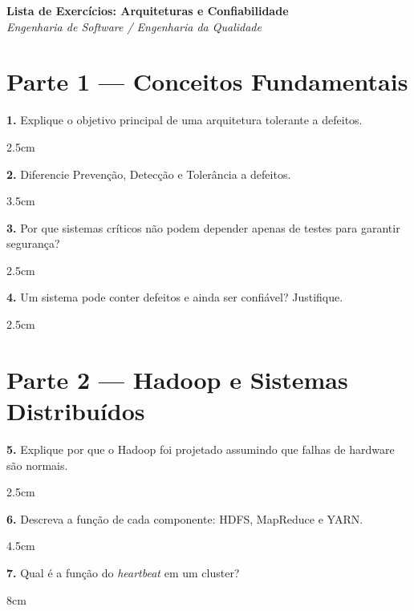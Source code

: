 \documentclass[12pt]{article}
\begin{document}

  \begin{center}
    {\Large \textbf{Lista de Exercícios: Arquiteturas e Confiabilidade}}\\[0.2cm]
    \textit{Engenharia de Software / Engenharia da Qualidade}
  \end{center}

  \vspace{0.4cm}

  \section*{Parte 1 — Conceitos Fundamentais}

  \textbf{1.} Explique o objetivo principal de uma arquitetura tolerante a defeitos.
  \begin{resposta}{2.5cm}
  \end{resposta}

  \textbf{2.} Diferencie Prevenção, Detecção e Tolerância a defeitos.
  \begin{resposta}{3.5cm}
  \end{resposta}

  \textbf{3.} Por que sistemas críticos não podem depender apenas de testes para garantir segurança?
  \begin{resposta}{2.5cm}
  \end{resposta}

  \textbf{4.} Um sistema pode conter defeitos e ainda ser confiável? Justifique.
  \begin{resposta}{2.5cm}
  \end{resposta}

  \newpage

  \section*{Parte 2 — Hadoop e Sistemas Distribuídos}

  \textbf{5.} Explique por que o Hadoop foi projetado assumindo que falhas de hardware são normais.
  \begin{resposta}{2.5cm}
  \end{resposta}

  \textbf{6.} Descreva a função de cada componente: HDFS, MapReduce e YARN.
  \begin{resposta}{4.5cm}
  \end{resposta}

  \textbf{7.} Qual é a função do \textit{heartbeat} em um cluster?
  \begin{resposta}{8cm}
  \end{resposta}
\end{document}
